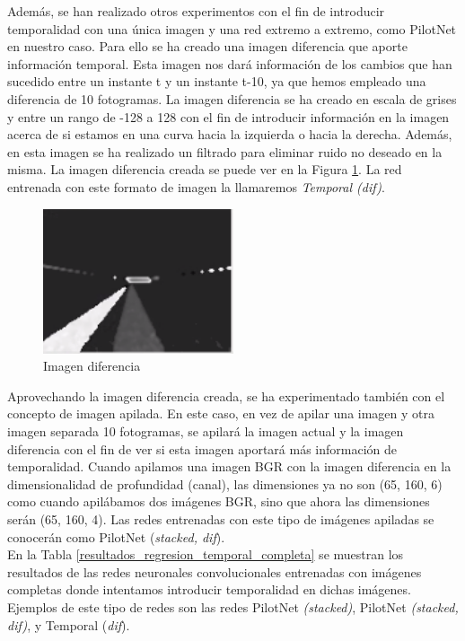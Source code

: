 Además, se han realizado otros experimentos con el fin de introducir temporalidad con una única imagen y una red extremo a extremo, como PilotNet en nuestro caso. Para ello se ha creado una imagen diferencia que aporte información temporal. Esta imagen nos dará información de los cambios que han sucedido entre un instante t y un instante t-10, ya que hemos empleado una diferencia de 10 fotogramas. La imagen diferencia se ha creado en escala de grises y entre un rango de -128 a 128 con el fin de introducir información en la imagen acerca de si estamos en una curva hacia la izquierda o hacia la derecha. Además, en esta imagen se ha realizado un filtrado para eliminar ruido no deseado en la misma. La imagen diferencia creada se puede ver en la Figura \ref{fig.diferencia_reg}. La red entrenada con este formato de imagen la llamaremos \textit{Temporal (dif)}.\\

\begin{figure}
\begin{center}
	\includegraphics[width=0.5\textwidth]{figures/Regresion/dif_gray_128.png}
   \caption{Imagen diferencia}
	\label{fig.diferencia_reg}
\end{center}
\end{figure}

Aprovechando la imagen diferencia creada, se ha experimentado también con el concepto de imagen apilada. En este caso, en vez de apilar una imagen y otra imagen separada 10 fotogramas, se apilará la imagen actual y la imagen diferencia con el fin de ver si esta imagen aportará más información de temporalidad. Cuando apilamos una imagen BGR con la imagen diferencia en la dimensionalidad de profundidad (canal), las dimensiones ya no son (65, 160, 6) como cuando apilábamos dos imágenes BGR, sino que ahora las dimensiones serán (65, 160, 4). Las redes entrenadas con este tipo de imágenes apiladas se conocerán como PilotNet (\textit{stacked, dif}). \\


En la Tabla \ref{resultados_regresion_temporal_completa} se muestran los resultados de las redes neuronales convolucionales entrenadas con imágenes completas donde intentamos introducir temporalidad en dichas imágenes. Ejemplos de este tipo de redes son las redes PilotNet \textit{(stacked)}, PilotNet \textit{(stacked, dif)}, y Temporal (\textit{dif}).\\


